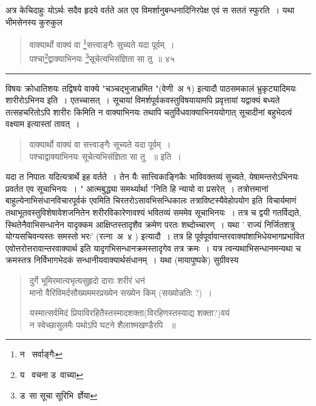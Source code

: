 \documentclass[11pt, openany]{book}
\begin{document}
अत्र केचिदाहुः योऽर्थः सदैव हृदये वर्तते अत एव विमर्शानुबन्धनादिनिरपेक्ष एवं स सततं स्फुरति~। यथा भीमसेनस्य कुरुकुल\textendash\ 

\newpage

\begin{quote}
 {\na वाक्यार्थो वाक्यं वा \renewcommand{\thefootnote}{1}\footnote{न \textendash\ सर्वाङ्गैः}सत्त्वाङ्गैः सुच्यते यदा पूर्वम्~। \\
पश्चा\renewcommand{\thefootnote}{2}\footnote{य \textendash\ वचना ड\textendash\ वाच्या}द्वाक्याभिनयः \renewcommand{\thefootnote}{3}\footnote{ड\textendash\ सा सूचा सूरिभि\textendash\ र्ज्ञेया}सूचेत्यभिसंज्ञिता सा तु~॥ ४५}
\end{quote}
 
\hrule

\vspace{2mm}

विषयः क्रोधातिशयः तद्विषये वाक्ये "चञ्चद्भुजाभ्रमित "(वेणी\textendash\ अ १) इत्यादौ पाठसमकालं भ्रुकृट्यादिमयः शारीरोऽभिनय इति~। एतच्चासत्~। सूचायां विमर्शपूर्वकवस्तुविषयायामपि प्रवृत्तायां यद्वाक्यं बध्यते तत्सहचरितोऽपि शारीरः किमिति न वाक्याभिनयः तथापि चतुर्विधवाक्याभिनययोगात् सूचादीनां बहुभेदत्वं वक्ष्याम इत्यास्तां तावत्~। \\

\begin{quote}
 {\qt वाक्यार्थो वाक्यं वा सत्त्वाङ्गैः सूच्यते यदा पूर्वम्~। \\
पश्चाद्वाक्याभिनयः सूचेत्यभिसंज्ञिता सा तु ~॥ इति~। }
\end{quote}

यदा त निपातः यदित्यत्रार्थे इह वर्तते~। तेन यैः सात्त्विकाङ्गिकैः भाविवक्तव्यं सुच्यते, येषामन्तरोऽभिनयः प्रवर्तत एव सूचाभिनयः~। " आत्मबुद्ध्या समर्थ्यार्था "निति हि न्यायो वा प्रसरेत्~। तत्रोत्तमानां बाहुल्येनाभिसंधानविचारपूर्वकं एवमिति चिरतरोऽसावभिसन्धिकालः तत्राविष्टस्यैवेहोपयोग इति\textendash\ विचार्यमाणं तथाभूतवस्तुविशेषावेशजनितेन शरीरविकारेणावश्यं भवितव्यं सममेव सूचाभिनयः~। तत्र च द्वयी गतर्विद्यते, स्थितेनैवाभिसन्धानेन यादृक्कम आक्षिप्तस्तादृशैव क्रमेण परतः शब्दोच्चारण्~। यथा ' राज्यं निर्जितशत्रु योग्यसचिवन्यस्तः समस्तो भरः' (रत्ना\textendash\ अ\textendash\ ४ ) इत्यादौ~। तत्र हि पूर्वपूर्वावान्तरवाक्यांशाभिधेयभागप्रभावित एवोत्तरोत्तरावान्तरवाक्यार्थ इति यादृगभिसन्धानक्रमस्तादृगेव तत्र क्रमः~। यत्र त्वन्यथाभिसन्धानमन्यथा च क्रमस्तत्र निर्विभागभेदकं सन्धानीयवाक्यार्थसंधानम्~। यथा (मायापुष्पके) सुग्रीवस्य\textendash\ 

\begin{quote}
 {\qt दुर्गे भूमिरमात्यभृत्यसुहृदो दाराः शरीरं धनं \\
मानो वैरिविमर्दसौख्यममरप्रख्येन सख्येन किम् (सख्योन्नतिः ?)~। 

यस्मात्सर्वमिदं प्रियाविरहितैस्तस्मादशक्ता(विरहिणस्तस्याद्य शक्ता?)वयं\\
न स्वेच्छासुलमैः पथोऽपि घटने शैलाश्मखण्डैरपि ~॥ }
\end{quote}
\end{document}
